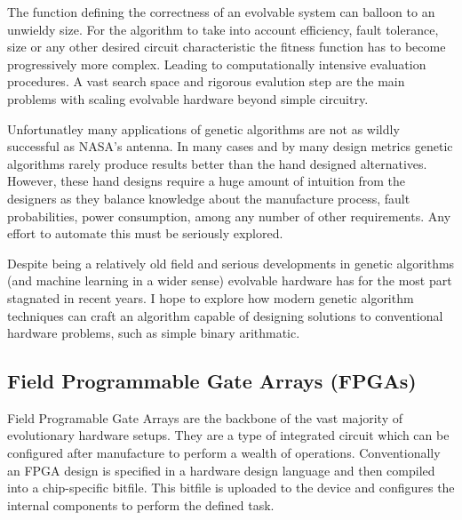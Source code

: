 The function defining the correctness of an evolvable system can balloon
to an unwieldy size. For the algorithm to take into account efficiency, fault tolerance, size
or any other desired circuit characteristic the fitness function has to
become progressively more complex. Leading to computationally intensive
evaluation procedures. A vast search space and rigorous evalution step
are the main problems with scaling evolvable hardware beyond simple circuitry.

Unfortunatley many applications of genetic algorithms are not as wildly
successful as NASA's antenna.
In many cases and by many design metrics genetic algorithms rarely produce results
better than the hand designed alternatives. However, these hand designs require
a huge amount of intuition from the designers as they balance
knowledge about the manufacture process, fault probabilities, power
consumption, among any number of other requirements. Any effort to automate
this must be seriously explored.

Despite being a relatively old field and serious developments in genetic
algorithms (and machine learning in a wider sense) evolvable hardware has for
the most part stagnated in recent years. I hope to explore how modern
genetic algorithm techniques can craft an algorithm capable of designing solutions
to conventional hardware problems, such as simple binary arithmatic.

\subsection{Field Programmable Gate Arrays (FPGAs) \label{ss:FPGAs}}
Field Programable Gate Arrays are the backbone of the vast majority of evolutionary
hardware setups. They are a type of integrated circuit which can be
configured after manufacture to perform a wealth of operations. Conventionally
an FPGA design is specified in a hardware design language and then compiled into a chip-specific bitfile.
This bitfile is uploaded to the device and configures the internal components
to perform the defined task.

